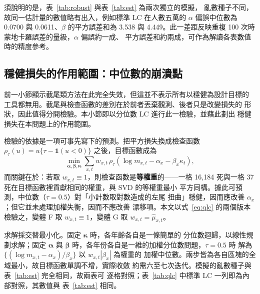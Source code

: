 \documentclass[UTF8, fontset=macnew, a4paper, 12pt]{ctexart}
\begin{document}
須說明的是，表~\ref{tab:robust} 與表~\ref{tab:est} 為兩次獨立的模擬，
亂數種子不同，故同一估計量的數值略有出入，例如標準 LC 在人數五萬的
$\alpha$ 偏誤中位數為 0.0700 與 0.0611、$\beta$ 的平方誤差和為 3.538 與
4.449。此一差距反映重複 100 次時蒙地卡羅誤差的量級，$\alpha$ 偏誤約一成、
平方誤差和約兩成，可作為解讀各表數值時的精度參考。

\subsection{穩健損失的作用範圍：中位數的崩潰點}\label{sec:qlc}

前一小節顯示截尾類方法在此完全失效，但這並不表示所有以穩健為設計目標的
工具都無用。截尾與檢查函數的差別在於前者丟棄觀測、後者只是改變損失的
形狀，因此值得分開檢驗。本小節即以分位數 LC 進行此一檢驗，並藉此劃出
穩健損失在本問題上的作用範圍。

檢驗的依據是一項可事先寫下的預測。把平方損失換成檢查函數
$\rho_\tau(u)=u\{\tau-\mathbf{1}(u<0)\}$ 之後，目標函數成為
\begin{equation}\label{eq:qlc}
\min_{\boldsymbol{\alpha},\boldsymbol{\beta},\boldsymbol{\kappa}}
\sum_{x,t} w_{x,t}\,
\rho_\tau\!\left(\log m_{x,t}-\alpha_x-\beta_x\kappa_t\right),
\end{equation}
而關鍵在於：若取 $w_{x,t}\equiv1$，則檢查函數是\textbf{等權重}的——一格
16{,}184 死與一格 37 死在目標函數裡貢獻相同的權重，與 SVD 的等權重最小
平方同構。據此可預測，中位數（$\tau=0.5$）對「小計數取對數造成的左尾
扭曲」穩健，因而應改善 $\alpha_x$；但它並未處理加權失衡，因而不應改善
漂移項。本文以式~\eqref{eq:qlc} 的兩個版本檢驗之，變體 F 取
$w_{x,t}\equiv1$，變體 G 取 $w_{x,t}=\hat\mu_{x,t}$。

求解採交替最小化。固定 $\boldsymbol{\kappa}$ 時，各年齡各自是一條簡單的
分位數迴歸，以線性規劃求解；固定 $\boldsymbol{\alpha}$ 與
$\boldsymbol{\beta}$ 時，各年份各自是一維的加權分位數問題，$\tau=0.5$ 時
解為 $\{(\log m_{x,t}-\alpha_x)/\beta_x\}$ 以 $w_{x,t}|\beta_x|$ 為權重的
加權中位數。兩步皆為各自區塊的全域最小，故目標函數單調不增，實際收斂
約需六至七次迭代。模擬的亂數種子與表~\ref{tab:est} 完全相同，故兩表可
逐格對照；表~\ref{tab:qlc} 中標準 LC 一列即為內部對照，其數值與
表~\ref{tab:est} 相同。
\end{document}
